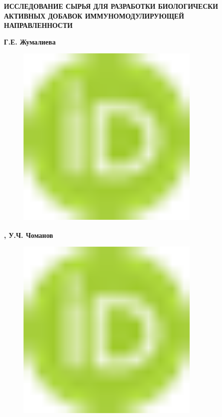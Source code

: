 
{\bfseries ИССЛЕДОВАНИЕ СЫРЬЯ ДЛЯ РАЗРАБОТКИ БИОЛОГИЧЕСКИ АКТИВНЫХ ДОБАВОК
ИММУНОМОДУЛИРУЮЩЕЙ НАПРАВЛЕННОСТИ}

{\bfseries Г.Е.
Жумалиева}
\begin{figure}[H]
	\centering
	\includegraphics[width=0.8\textwidth]{media/pish/image10}
	\caption*{}
\end{figure}
{\bfseries \textsuperscript{\envelope },
У.Ч.
Чоманов}
\begin{figure}[H]
	\centering
	\includegraphics[width=0.8\textwidth]{media/pish/image10}
	\caption*{}
\end{figure}

